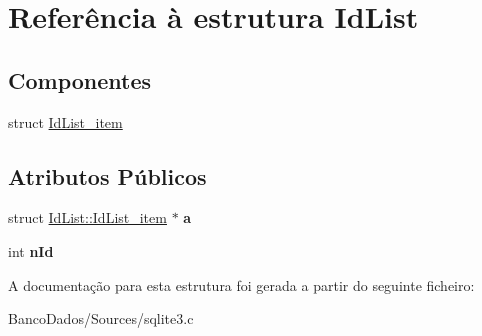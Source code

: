 \hypertarget{struct_id_list}{\section{Referência à estrutura Id\-List}
\label{struct_id_list}
}
\subsection*{Componentes}
\begin{DoxyCompactItemize}
\item 
struct \hyperlink{struct_id_list_1_1_id_list__item}{Id\-List\-\_\-item}
\end{DoxyCompactItemize}
\subsection*{Atributos Públicos}
\begin{DoxyCompactItemize}
\item 
\hypertarget{struct_id_list_ad33082fd71286c1159711a1a3e979763}{struct \hyperlink{struct_id_list_1_1_id_list__item}{Id\-List\-::\-Id\-List\-\_\-item} $\ast$ {\bfseries a}}\label{struct_id_list_ad33082fd71286c1159711a1a3e979763}

\item 
\hypertarget{struct_id_list_afb785717796d8b3c72d1ae682dcb6ff0}{int {\bfseries n\-Id}}\label{struct_id_list_afb785717796d8b3c72d1ae682dcb6ff0}

\end{DoxyCompactItemize}


A documentação para esta estrutura foi gerada a partir do seguinte ficheiro\-:\begin{DoxyCompactItemize}
\item 
Banco\-Dados/\-Sources/sqlite3.\-c\end{DoxyCompactItemize}
